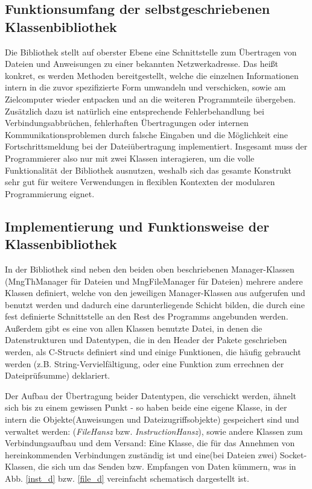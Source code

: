 \subsection{Funktionsumfang der selbstgeschriebenen Klassenbibliothek}
Die Bibliothek stellt auf oberster Ebene eine Schnittstelle zum Übertragen von Dateien und Anweisungen zu einer bekannten Netzwerkadresse.
Das heißt konkret, es werden Methoden bereitgestellt, welche die einzelnen Informationen intern in die zuvor spezifizierte Form umwandeln und verschicken, sowie am Zielcomputer wieder entpacken und an die weiteren Programmteile übergeben.
Zusätzlich dazu ist natürlich eine entsprechende Fehlerbehandlung bei Verbindungsabbrüchen, fehlerhaften Übertragungen oder internen Kommunikationsproblemen durch falsche Eingaben und die Möglichkeit eine Fortschrittsmeldung bei der Dateiübertragung implementiert.
Insgesamt muss der Programmierer also nur mit zwei Klassen interagieren, um die volle Funktionalität der Bibliothek ausnutzen, weshalb sich das gesamte Konstrukt sehr gut für weitere Verwendungen in flexiblen Kontexten der modularen Programmierung eignet.

\subsection{Implementierung und Funktionsweise der Klassenbibliothek}
In der Bibliothek sind neben den beiden oben beschriebenen Manager-Klassen (MngThManager für Dateien und MngFileManager für Dateien) mehrere andere Klassen definiert, welche von den jeweiligen Manager-Klassen aus aufgerufen und benutzt werden und dadurch eine darunterliegende Schicht bilden, die durch eine fest definierte Schnittstelle an den Rest des Programms angebunden werden.
Außerdem gibt es eine von allen Klassen benutzte Datei, in denen die Datenstrukturen und Datentypen, die in den Header der Pakete geschrieben werden, als C-Structs definiert sind und einige Funktionen, die häufig gebraucht werden (z.B. String-Vervielfältigung, oder eine Funktion zum errechnen der Dateiprüfsumme) deklariert.\par
Der Aufbau der Übertragung beider Datentypen, die verschickt werden, ähnelt sich bis zu einem gewissen Punkt - so haben beide eine eigene Klasse, in der intern die Objekte(Anweisungen und Dateizugriffsobjekte) gespeichert sind und verwaltet werden: (\textit{FileHansz} bzw. \textit{InstructionHansz}), sowie andere Klassen zum Verbindungsaufbau und dem Versand: Eine Klasse, die für das Annehmen von hereinkommenden Verbindungen zuständig ist und eine(bei Dateien zwei) Socket-Klassen, die sich um das Senden bzw. Empfangen von Daten kümmern, was in Abb. \ref{inst_d} bzw. \ref{file_d} vereinfacht schematisch dargestellt ist.\\\\

